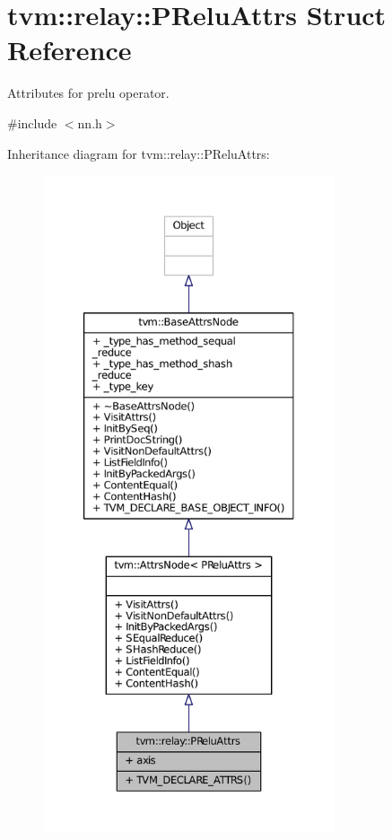 \hypertarget{structtvm_1_1relay_1_1PReluAttrs}{}\section{tvm\+:\+:relay\+:\+:P\+Relu\+Attrs Struct Reference}
\label{structtvm_1_1relay_1_1PReluAttrs}


Attributes for prelu operator.  




{\ttfamily \#include $<$nn.\+h$>$}



Inheritance diagram for tvm\+:\+:relay\+:\+:P\+Relu\+Attrs\+:
\nopagebreak
\begin{figure}[H]
\begin{center}
\leavevmode
\includegraphics[height=550pt]{structtvm_1_1relay_1_1PReluAttrs__inherit__graph}
\end{center}
\end{figure}


